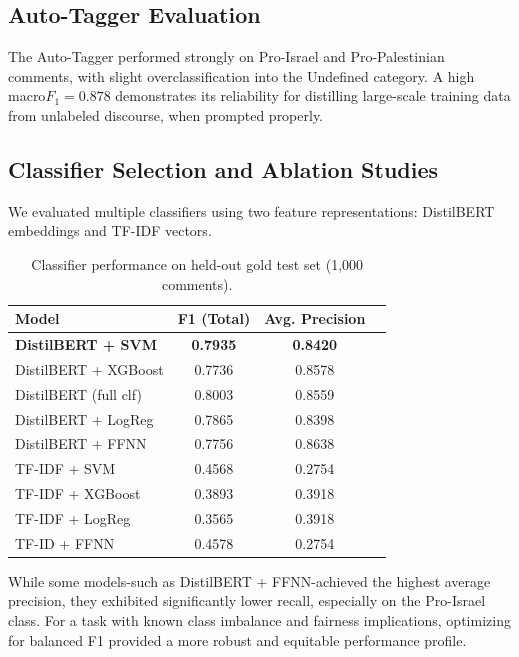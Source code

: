 \documentclass[letterpaper]{article} %
\begin{document}
\subsection{Auto-Tagger Evaluation}

The Auto-Tagger performed strongly on Pro-Israel and Pro-Palestinian comments, with slight overclassification into the Undefined category. A high macro\(F_{1}=0.878\) demonstrates its reliability for distilling large-scale training data from unlabeled discourse, when prompted properly.

\subsection{Classifier Selection and Ablation Studies}

We evaluated multiple classifiers using two feature representations: DistilBERT embeddings and TF-IDF vectors.

\begin{table}[h!]
\centering
\caption{Classifier performance on held-out gold test set (1,000 comments).}
\label{tab:final-results}
\begin{tabular}{lccc}
\toprule
\textbf{Model} & \textbf{F1 (Total)} & \textbf{Avg. Precision} \\
\midrule
\textbf{DistilBERT + SVM} & \textbf{0.7935} & \textbf{0.8420} \\
DistilBERT + XGBoost      & 0.7736 & 0.8578 \\
DistilBERT (full clf)     & 0.8003 & 0.8559 \\
DistilBERT + LogReg       & 0.7865 & 0.8398 \\
DistilBERT + FFNN         & 0.7756 & 0.8638 \\
TF-IDF + SVM              & 0.4568 & 0.2754 \\
TF-IDF + XGBoost          & 0.3893 & 0.3918 \\
TF-IDF + LogReg           & 0.3565 & 0.3918 \\
TF-ID + FFNN              & 0.4578 & 0.2754 \\
\bottomrule
\end{tabular}
\end{table}

While some models-such as DistilBERT + FFNN-achieved the highest average precision, they exhibited significantly lower recall, especially on the Pro-Israel class. For a task with known class imbalance and fairness implications, optimizing for balanced F1 provided a more robust and equitable performance profile.
\end{document}
